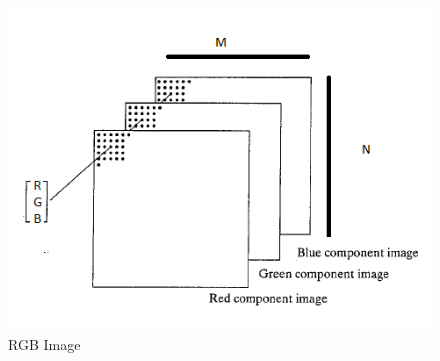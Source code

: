\begin{figure}[htbp]
	\centering
		\includegraphics[scale=0.65]{fig/ImagenRGB.png}
	\caption{RGB Image}
	\label{fig:ImagenRGB}
\end{figure}



	
	
	
	

